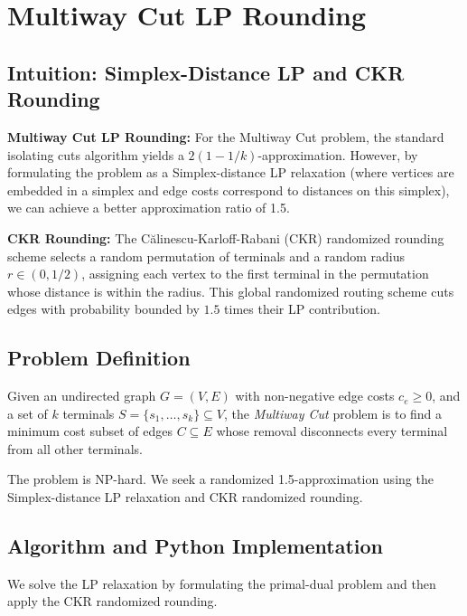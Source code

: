 \documentclass[11pt,oneside]{book}
\begin{document}
\setcounter{chapter}{18}
\chapter{Multiway Cut LP Rounding}
\label{ch:multiway_rounding}

\section{Intuition: Simplex-Distance LP and CKR Rounding}

\begin{intuitionbox}
\textbf{Multiway Cut LP Rounding:} For the Multiway Cut problem, the standard isolating cuts algorithm yields a $2(1-1/k)$-approximation. However, by formulating the problem as a Simplex-distance LP relaxation (where vertices are embedded in a simplex and edge costs correspond to distances on this simplex), we can achieve a better approximation ratio of 1.5. 

\textbf{CKR Rounding:} The Călinescu-Karloff-Rabani (CKR) randomized rounding scheme selects a random permutation of terminals and a random radius $r \in (0, 1/2)$, assigning each vertex to the first terminal in the permutation whose distance is within the radius. This global randomized routing scheme cuts edges with probability bounded by $1.5$ times their LP contribution.
\end{intuitionbox}

\section{Problem Definition}
Given an undirected graph $G = (V, E)$ with non-negative edge costs $c_e \ge 0$, and a set of $k$ terminals $S = \{s_1, \dots, s_k\} \subseteq V$, the \emph{Multiway Cut} problem is to find a minimum cost subset of edges $C \subseteq E$ whose removal disconnects every terminal from all other terminals.

The problem is NP-hard. We seek a randomized 1.5-approximation using the Simplex-distance LP relaxation and CKR randomized rounding.

\section{Algorithm and Python Implementation}
We solve the LP relaxation by formulating the primal-dual problem and then apply the CKR randomized rounding.
\end{document}
